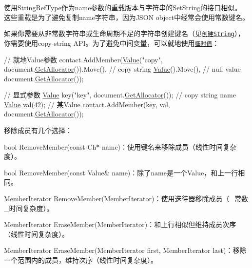 使用{\ttfamily String\+Ref\+Type}作为name参数的重载版本与字符串的{\ttfamily Set\+String}的接口相似。 这些重载是为了避免复制{\ttfamily name}字符串，因为\+J\+S\+ON object中经常会使用常数键名。

如果你需要从非常数字符串或生命周期不足的字符串创建键名（见\href{#CreateString}{\tt 创建\+String}），你需要使用copy-\/string A\+P\+I。为了避免中间变量，可以就地使用\href{#TemporaryValues}{\tt 临时值}：


\begin{DoxyCode}
\textcolor{comment}{// 就地Value参数}
contact.AddMember(\hyperlink{document_8h_a071cf97155ba72ac9a1fc4ad7e63d481}{Value}(\textcolor{stringliteral}{"copy"}, document.\hyperlink{class_generic_document_aa4609d6b19f86aec1a6b96edf2c27686}{GetAllocator}()).Move(), \textcolor{comment}{// copy string}
                  \hyperlink{document_8h_a071cf97155ba72ac9a1fc4ad7e63d481}{Value}().Move(),                                \textcolor{comment}{// null value}
                  document.\hyperlink{class_generic_document_aa4609d6b19f86aec1a6b96edf2c27686}{GetAllocator}());

\textcolor{comment}{// 显式参数}
\hyperlink{class_generic_value}{Value} key(\textcolor{stringliteral}{"key"}, document.\hyperlink{class_generic_document_aa4609d6b19f86aec1a6b96edf2c27686}{GetAllocator}()); \textcolor{comment}{// copy string name}
\hyperlink{class_generic_value}{Value} val(42);                             \textcolor{comment}{// 某Value}
contact.AddMember(key, val, document.\hyperlink{class_generic_document_aa4609d6b19f86aec1a6b96edf2c27686}{GetAllocator}());
\end{DoxyCode}


移除成员有几个选择：


\begin{DoxyItemize}
\item {\ttfamily bool Remove\+Member(const Ch$\ast$ name)}：使用键名来移除成员（线性时间复杂度）。
\item {\ttfamily bool Remove\+Member(const Value\& name)}：除了{\ttfamily name}是一个\+Value，和上一行相同。
\item {\ttfamily Member\+Iterator Remove\+Member(\+Member\+Iterator)}：使用迭待器移除成员（\+\_\+常数\+\_\+时间复杂度）。
\item {\ttfamily Member\+Iterator Erase\+Member(\+Member\+Iterator)}：和上行相似但维持成员次序（线性时间复杂度）。
\item {\ttfamily Member\+Iterator Erase\+Member(\+Member\+Iterator first, Member\+Iterator last)}：移除一个范围内的成员，维持次序（线性时间复杂度）。
\end{DoxyItemize}

